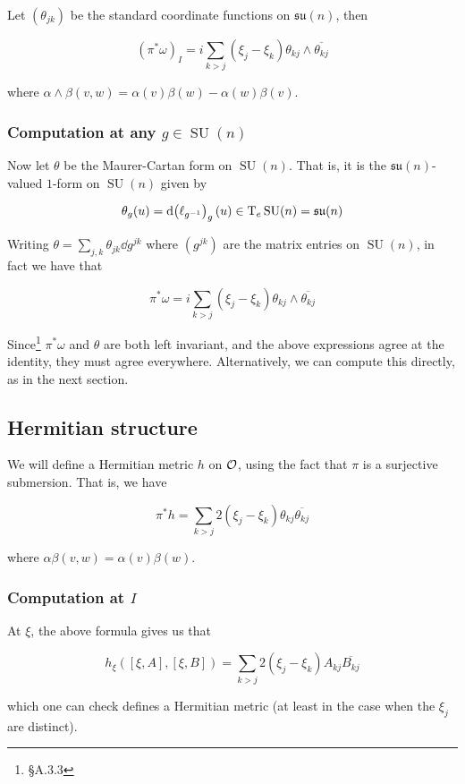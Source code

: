 \documentclass{article}
\DeclareMathOperator{\SU}{SU}
\newcommand{\su}{\mathfrak{su}}
\begin{document}
Let \((\theta_{jk})\) be the standard coordinate functions on \(\su(n)\), then

\[(\pi^*\omega)_I = i \sum_{k > j}(\xi_j - \xi_k)\theta_{kj}\wedge \overline{\theta_{kj}}\]

where \(\alpha \wedge \beta(v, w) = \alpha(v)\beta(w) - \alpha(w)\beta(v)\).

\subsubsection{Computation at any \(g \in \SU(n)\)}

Now let \(\theta\) be the Maurer-Cartan form on \(\SU(n)\). That is, it is the \(\su(n)\)-valued \(1\)-form on \(\SU(n)\) given by

\[\theta_g(u) = \dd (\ell_{g^{-1}})_g(u) \in \TT_e\SU(n) = \su(n)\]

Writing \(\theta = \sum_{j, k}\theta_{jk}\dd g^{jk}\) where \((g^{jk})\) are the matrix entries on \(\SU(n)\), in fact we have that

\[\pi^*\omega = i \sum_{k > j}(\xi_j - \xi_k)\theta_{kj}\wedge \overline{\theta_{kj}}\]

Since\footnote{\S A.3.3} \(\pi^*\omega\) and \(\theta\) are both left invariant, and the above expressions agree at the identity, they must agree everywhere. Alternatively, we can compute this directly, as in the next section.

\subsection{Hermitian structure}

We will define a Hermitian metric \(h\) on \(\mathcal{O}\), using the fact that \(\pi\) is a surjective submersion. That is, we have

\[\pi^*h = \sum_{k > j}2(\xi_j - \xi_k)\theta_{kj}\overline{\theta_{kj}}\]

where \(\alpha\beta(v, w) = \alpha(v)\beta(w)\).

\subsubsection{Computation at \(I\)}

At \(\xi\), the above formula gives us that

\[h_\xi([\xi, A], [\xi, B]) = \sum_{k > j}2(\xi_j - \xi_k)A_{kj}\overline{B_{kj}}\]

which one can check defines a Hermitian metric (at least in the case when the \(\xi_j\) are distinct).
\end{document}
